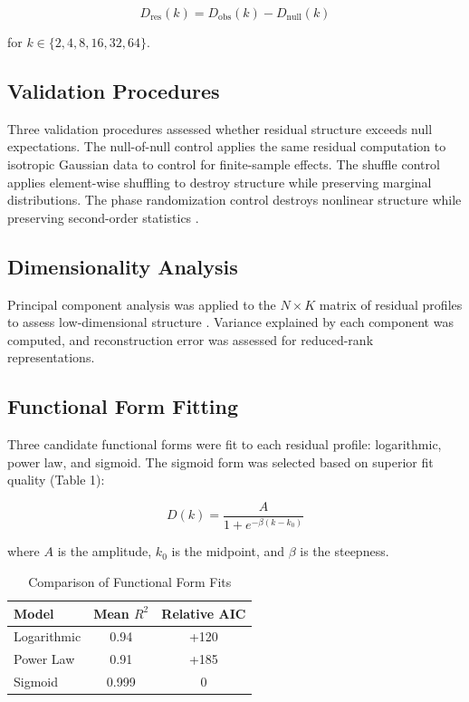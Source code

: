 \documentclass[11pt]{article}
\begin{document}
\begin{equation}
	D_{\text{res}}(k) = D_{\text{obs}}(k) - D_{\text{null}}(k)
\end{equation}

for $k \in \{2, 4, 8, 16, 32, 64\}$.

\subsection{Validation Procedures}

Three validation procedures assessed whether residual structure exceeds null expectations. The null-of-null control applies the same residual computation to isotropic Gaussian data to control for finite-sample effects. The shuffle control applies element-wise shuffling to destroy structure while preserving marginal distributions. The phase randomization control destroys nonlinear structure while preserving second-order statistics \citep{coifman2006diffusion}.

\subsection{Dimensionality Analysis}

Principal component analysis was applied to the $N \times K$ matrix of residual profiles to assess low-dimensional structure \citep{jolliffe2002principal}. Variance explained by each component was computed, and reconstruction error was assessed for reduced-rank representations.

\subsection{Functional Form Fitting}

Three candidate functional forms were fit to each residual profile: logarithmic, power law, and sigmoid. The sigmoid form was selected based on superior fit quality (Table 1):

\begin{equation}
	D(k) = \frac{A}{1 + e^{-\beta(k - k_0)}}
\end{equation}

where $A$ is the amplitude, $k_0$ is the midpoint, and $\beta$ is the steepness.

\begin{table}[H]
	\centering
	\begin{tabular}{lcc}
		\toprule
		\textbf{Model} & \textbf{Mean } $R^2$ & \textbf{Relative AIC} \\
		\midrule
		Logarithmic    & 0.94                 & +120                  \\
		Power Law      & 0.91                 & +185                  \\
		Sigmoid        & 0.999                & 0                     \\
		\bottomrule
	\end{tabular}
	\caption{Comparison of Functional Form Fits}
	\label{tab:model_comparison}
\end{table}
\end{document}
